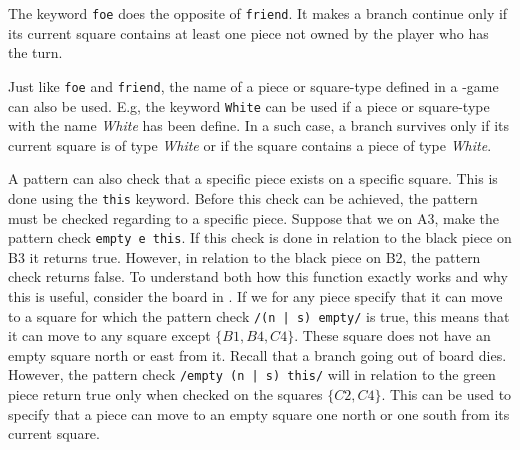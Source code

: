 The keyword \texttt{foe} does the opposite of \texttt{friend}. It makes a branch continue only if its current square contains at least one piece not owned by the player who has the turn.

Just like \texttt{foe} and \texttt{friend}, the name of a piece or square-type defined in a \productname{}-game can also be used. E.g, the keyword \texttt{White} can be used if a piece or square-type with the name \textit{White} has been define. In a such case, a branch survives only if its current square is of type \textit{White} or if the square contains a piece of type \textit{White}.

A pattern can also check that a specific piece exists on a specific square. This is done using the \texttt{this} keyword.
Before this check can be achieved, the pattern must be checked regarding to a specific piece. Suppose that we on A3, make the pattern check
\texttt{empty e this}. If this check is done in relation to the black piece on B3 it returns true. However, in relation to the black piece on B2, the pattern check returns false. To understand both how this function exactly works and why this is useful, consider the board in .
If we for any piece specify that it can move to a square for which the pattern check \texttt{/(n | s) empty/} is true, this means that it can move to any square except $\{B1, B4, C4\}$. These square does not have an empty square north or east from it. Recall that a branch going out of board dies.
However, the pattern check \texttt{/empty (n | s) this/} will in relation to the green piece return true only when checked on the squares $\{C2, C4\}$.
This can be used to specify that a piece can move to an empty square one north or one south from its current square. 